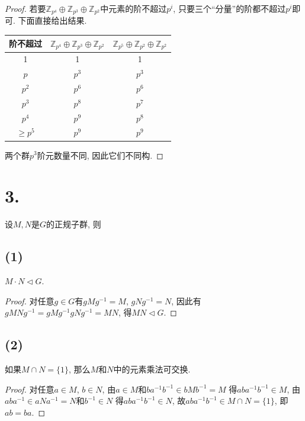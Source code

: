 \documentclass[12pt, a4paper, fontset=windows]{ctexart}
\newcommand{\Z}{\mathbb{Z}}
\newcommand{\yh}[1]{“{#1}”} %
\begin{document}
\begin{proof}
若要$\Z_{p^4}\oplus\Z_{p^3}\oplus\Z_{p^2}$中元素的阶不超过$p^i$, 
只要三个\yh{分量}的阶都不超过$p^i$即可. 下面直接给出结果. 

\vspace{1em}

\begin{center}\begin{tabular}{c|c c}
阶不超过 & $\Z_{p^4}\oplus\Z_{p^3}\oplus\Z_{p^2}$ & $\Z_{p^5}\oplus\Z_{p^2}\oplus\Z_{p^2}$\\
\hline
1 & 1 & 1\\
$p$ & $p^3$ & $p^3$\\
$p^2$ & $p^6$ & $p^6$\\
$p^3$ & $p^8$ & $p^7$\\
$p^4$ & $p^9$ & $p^8$\\
$\ge p^5$ & $p^9$ & $p^9$
\end{tabular}\end{center}

\vspace{1em}

两个群$p^3$阶元数量不同, 因此它们不同构. 
\end{proof}

\section*{3.}

设$M,N$是$G$的正规子群, 则

\subsection*{(1)}

$M\cdot N\lhd G$. 

\begin{proof}
对任意$g\in G$有$gMg^{-1}=M$, $gNg^{-1}=N$, 因此有
$gMNg^{-1}=gMg^{-1}gNg^{-1}=MN$, 得$MN\lhd G$. 
\end{proof}

\subsection*{(2)}

如果$M\cap N=\{1\}$, 那么$M$和$N$中的元素乘法可交换. 

\begin{proof}
对任意$a\in M$, $b\in N$, 由$a\in M$和$ba^{-1}b^{-1}\in bMb^{-1}=M$
得$aba^{-1}b^{-1}\in M$, 由$aba^{-1}\in aNa^{-1}=N$和$b^{-1}\in N$
得$aba^{-1}b^{-1}\in N$, 故$aba^{-1}b^{-1}\in M\cap N=\{1\}$, 即$ab=ba$. 
\end{proof}
\end{document}
